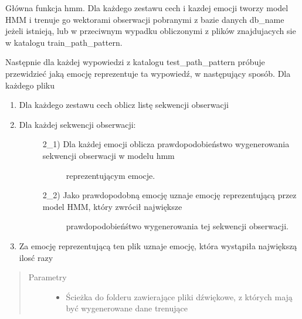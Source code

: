 \documentclass[letterpaper,10pt,polish]{sphinxmanual}
\begin{document}
\begin{fulllineitems}
\label{\detokenize{hmm_main:hmm_main.hmm_main}}
Główna funkcja hmm. Dla każdego zestawu cech i kazdej emocji tworzy model HMM i trenuje go wektorami obserwacji
pobranymi z bazie danych db\_name jeżeli istnieją, lub w przeciwnym wypadku obliczonymi z plików znajdujacych sie w katalogu
train\_path\_pattern.

Następnie dla każdej wypowiedzi z katalogu test\_path\_pattern próbuje przewidzieć jaką emocję reprezentuje ta
wypowiedź, w następujący sposób.
Dla każdego pliku
\begin{enumerate}
\item {} 
Dla każdego zestawu cech oblicz listę sekwencji obserwacji

\item {} \begin{description}
\item[{Dla każdej sekwencji obserwacji:}] \leavevmode\begin{description}
\item[{2\_1) Dla każdej emocji oblicza prawdopodobieństwo wygenerowania sekwencji obserwacji w modelu hmm}] \leavevmode
reprezentującym emocje.

\item[{2\_2) Jako prawdopodobną emocję uznaje emocję reprezentującą przez model HMM, który zwrócił największe}] \leavevmode
prawdopodobieńśtwo wygenerowania tej sekwencji obserwacji.

\end{description}

\end{description}

\item {} 
Za emocję reprezentującą ten plik uznaje emocję, która wystąpiła największą ilosć razy

\end{enumerate}
\begin{quote}\begin{description}
\item[{Parametry}] \leavevmode\begin{itemize}
\item {} 
 \textendash{} Ścieżka do folderu zawierające pliki dźwiękowe, z których mają
być wygenerowane dane trenujące


\end{itemize}
\end{description}
\end{quote}
\end{fulllineitems}
\end{document}
